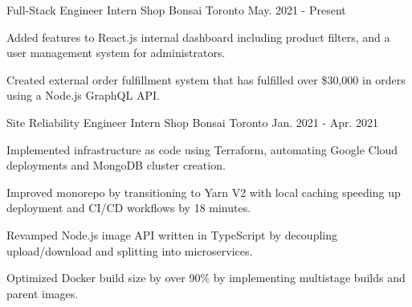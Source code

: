 

\begin{cventries}

  \cventry
    {Full-Stack Engineer Intern} %
    {Shop Bonsai} %
    {Toronto} %
    {May. 2021 - Present} %
    {
      \begin{cvitems} %
        \item {Added features to React.js internal dashboard including product filters, and a user management system for administrators.}
        \item {Created external order fulfillment system that has fulfilled over \$30,000 in orders using a Node.js GraphQL API.}
      \end{cvitems}
    }
    
  \cventry
    {Site Reliability Engineer Intern} %
    {Shop Bonsai} %
    {Toronto} %
    {Jan. 2021 - Apr. 2021} %
    {
      \begin{cvitems} %
        \item {Implemented infrastructure as code using Terraform, automating Google Cloud deployments and MongoDB cluster creation.}
        \item {Improved monorepo by transitioning to Yarn V2 with local caching speeding up deployment and CI/CD workflows by 18 minutes.}
        \item {Revamped Node.js image API written in TypeScript by decoupling upload/download and splitting into microservices.}
        \item {Optimized Docker build size by over 90\% by implementing multistage builds and parent images.}
      \end{cvitems}
    }
    
\end{cventries}
